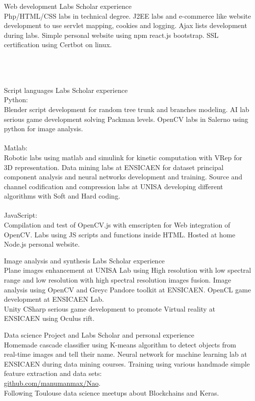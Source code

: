 \documentclass{tccv-master/tccv}
\begin{document}
\begin{eventlist}
\item{Web development}
{Labs}
{Scholar experience}\\
Php/HTML/CSS labs in technical degree.
J2EE labs and e-commerce like website development to use servlet mapping, cookies and logging.
Ajax lists development during labs.
Simple personal website using npm react.js bootstrap.
SSL certification using Certbot on linux.\\\\\\\\

\item{Script languages}
{Labs}
{Scholar experience}\\
Python: \\
Blender script development for random tree trunk and branches modeling. 
AI lab serious game development solving Packman levels.
OpenCV labs in Salerno using python for image analysis.\\\\
Matlab:\\
Robotic labs using matlab and simulink for kinetic computation with VRep for 3D representation.
Data mining labs at ENSICAEN for dataset principal component analysis and neural networks development and training.
Source and channel codification and compression labs at UNISA developing different algorithms with Soft and Hard coding.\\\\
JavaScript:\\
Compilation and test of OpenCV.js with emscripten for Web integration of OpenCV.
Labs using JS scripts and functions inside HTML.
Hosted at home Node.js personal website.

\item
{Image analysis and synthesis}
{Labs}
{Scholar experience}\\
Plane images enhancement at UNISA Lab using High resolution with low spectral range and low resolution with high spectral resolution images fusion.
Image analysis using OpenCV and Greyc Pandore toolkit at ENSICAEN.
OpenCL game development at ENSICAEN Lab.\\
Unity CSharp serious game development to promote Virtual reality at ENSICAEN using Oculus rift.

\item
{Data science}
{Project and Labs}
{Scholar and personal experience}\\
Homemade cascade classifier using K-means algorithm to detect objects from real-time images and tell their name.
Neural network for machine learning lab at ENSICAEN during data mining courses.
Training using various handmade simple feature extraction and data sets:\\
\href{https://github.com/manumanmax/Nao}{github.com/manumanmax/Nao}.\\
Following Toulouse data science meetups about Blockchains and Keras.


\end{eventlist}
\end{document}

